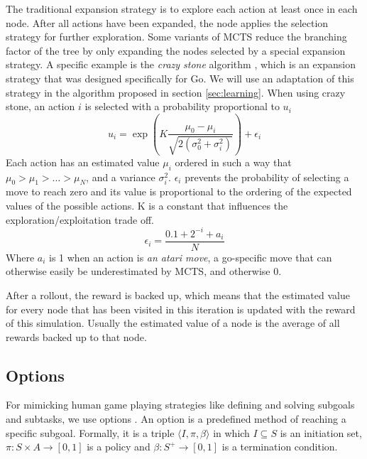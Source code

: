 The traditional expansion strategy is to explore each action at least once in
each node. After all actions have been expanded, the node applies the selection
strategy for further exploration. Some variants of MCTS reduce the branching
factor of the tree by only expanding the nodes selected by a special expansion
strategy. A specific example is the \emph{crazy stone} algorithm
\cite{coulom2007efficient}, which is an expansion strategy that was designed
specifically for Go. We will use an adaptation of this strategy in the algorithm
proposed in section \ref{sec:learning}.  When using crazy stone, an action $i$
is selected with a probability proportional to $u_i$
\begin{equation}
	\label{eq:crazystone}
	u_i = \exp\left(K \frac{\mu_0 - \mu_i}{\sqrt{2\left(\sigma_0^2 +
\sigma_i^2\right)}}\right) + \epsilon_i
\end{equation}
Each action has an estimated value $\mu_i$ ordered in such a way that $\mu_0 >
\mu_1 > \ldots > \mu_N$, and a variance $\sigma_i^2$. $\epsilon_i$ prevents 
the probability of selecting a move to reach zero and its value is proportional to
the ordering of the expected values of the possible actions. K is a constant
that influences the exploration/exploitation trade off.
\begin{equation}
	\label{eq:epsilon}
	\epsilon_i = \frac{0.1 + 2^{-i} + a_i}{N}
\end{equation}
Where $a_i$ is 1 when an action is \emph{an atari move}, a go-specific
move that can otherwise easily be underestimated by MCTS, and otherwise 0.

After a rollout, the reward is backed up, which means that the estimated value
for every node that has been visited in this iteration is updated with the
reward of this simulation. Usually the estimated value of a node is the average
of all rewards backed up to that node.

\subsection{Options}
\label{subsec:options}
For mimicking human game playing strategies like defining and solving subgoals
and subtasks, we use options \cite{sutton1999between, barto2003recent}. An
option is a predefined method of reaching a specific subgoal. Formally, it is a
triple $\langle I, \pi, \beta\rangle$ in which $I \subseteq S$ is an initiation
set, $\pi: S \times A \rightarrow [0, 1]$ is a policy and $\beta: S^+
\rightarrow[0,1]$ is a termination condition.

